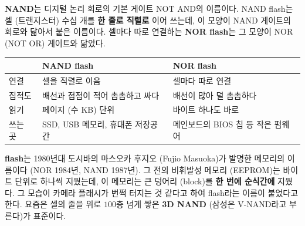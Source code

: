 \documentclass[11pt,a4paper]{article}
\begin{document}
\begin{remarkbox}
\textbf{NAND}는 디지털 논리 회로의 기본 게이트 NOT AND의 이름이다. NAND flash는 셀 (트랜지스터) 수십 개를 \textbf{한 줄로 직렬로} 이어 쓰는데,
이 모양이 NAND 게이트의 회로와 닮아서 붙은 이름이다. 셀마다 따로 연결하는 \textbf{NOR flash}는 그 모양이 NOR (NOT OR) 게이트와 닮았다.

\begin{center}
\end{center}

\begin{center}
{\small
\begin{tabular}{@{}lll@{}}
\toprule
& NAND flash & NOR flash \\
\midrule
연결 & 셀을 직렬로 이음 & 셀마다 따로 연결 \\
집적도 & 배선과 접점이 적어 촘촘하고 싸다 & 배선이 많아 덜 촘촘하다 \\
읽기 & 페이지 (수 KB) 단위 & 바이트 하나도 바로 \\
쓰는 곳 & SSD, USB 메모리, 휴대폰 저장공간 & 메인보드의 BIOS 칩 등 작은 펌웨어 \\
\bottomrule
\end{tabular}}
\end{center}

\textbf{flash}는 1980년대 도시바의 마스오카 후지오 (Fujio Masuoka)가 발명한 메모리의 이름이다 (NOR 1984년, NAND 1987년).
그 전의 비휘발성 메모리 (EEPROM)는 바이트 단위로 하나씩 지웠는데, 이 메모리는 큰 덩어리 (block)를 \textbf{한 번에 순식간에} 지웠다.
그 모습이 카메라 플래시가 번쩍 터지는 것 같다고 하여 flash라는 이름이 붙었다고 한다.
요즘은 셀의 줄을 위로 $100$층 넘게 쌓은 \textbf{3D NAND} (삼성은 V-NAND라고 부른다)가 표준이다.


\end{remarkbox}
\end{document}
